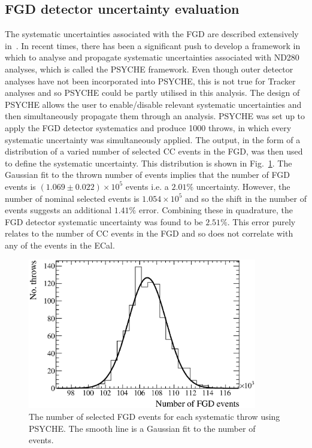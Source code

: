 \subsection{FGD detector uncertainty evaluation}
\label{subsec:FGDDetectorSystematics}
The systematic uncertainties associated with the FGD are described extensively in~\cite{CCIncSelFGDTN}.  In recent times, there has been a significant push to develop a framework in which to analyse and propagate systematic uncertainties associated with ND280 analyses, which is called the PSYCHE framework.  Even though outer detector analyses have not been incorporated into PSYCHE, this is not true for Tracker analyses and so PSYCHE could be partly utilised in this analysis.  The design of PSYCHE allows the user to enable/disable relevant systematic uncertainties and then simultaneously propagate them through an analysis.  PSYCHE was set up to apply the FGD detector systematics and produce 1000 throws, in which every systematic uncertainty was simultaneously applied.  The output, in the form of a distribution of a varied number of selected CC events in the FGD, was then used to define the systematic uncertainty.  This distribution is shown in Fig.~\ref{fig:FGDSystematicsNEvents}.  The Gaussian fit to the thrown number of events implies that the number of FGD events is $(1.069\pm0.022)\times10^5$ events i.e. a $2.01\%$ uncertainty.  However, the number of nominal selected events is $1.054\times10^5$ and so the shift in the number of events suggests an additional $1.41\%$ error.  Combining these in quadrature, the FGD detector systematic uncertainty was found to be $2.51\%$.  This error purely relates to the number of CC events in the FGD and so does not correlate with any of the events in the ECal.
\begin{figure}
  \centering
  \includegraphics[width=10cm]{images/measurement/systematics/detector/fgd/fgd_systematics_nevents.eps}
  \caption{The number of selected FGD events for each systematic throw using PSYCHE.  The smooth line is a Gaussian fit to the number of events.}
  \label{fig:FGDSystematicsNEvents}
\end{figure}
